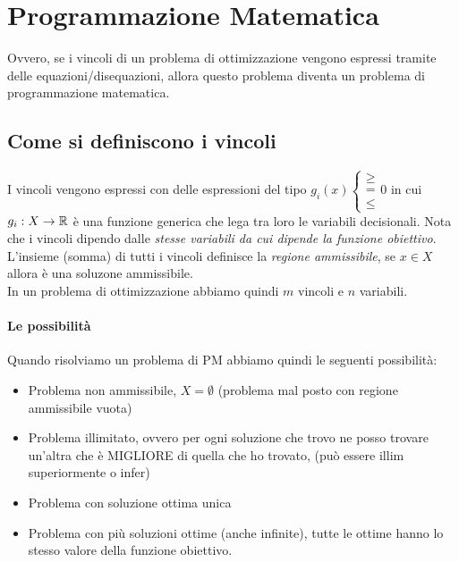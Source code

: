 \documentclass[12pt, a4paper, openany]{book}
\begin{document}
\section{Programmazione Matematica}
Ovvero, se i vincoli di un problema di ottimizzazione vengono espressi tramite delle equazioni/disequazioni, allora questo problema diventa un problema di programmazione matematica.

\subsection*{Come si definiscono i vincoli}
I vincoli vengono espressi con delle espressioni del tipo $g_i(x) \begin{cases}
        \geq \\ = \\ \leq %
    \end{cases} 0$
in cui $g_i: X\to \mathbb{R}$ è una funzione generica che lega tra loro le variabili decisionali.
Nota che i vincoli dipendo dalle \emph{stesse variabili da cui dipende la funzione obiettivo}.
\\L'insieme (somma) di tutti i vincoli definisce la \emph{regione ammissibile}, se $x \in X$ allora è una soluzone ammissibile.
\\In un problema di ottimizzazione abbiamo quindi $m$ vincoli e $n$ variabili.

\paragraph*{Le possibilità} Quando risolviamo un problema di PM abbiamo quindi le seguenti possibilità:
\begin{itemize}
    \item Problema non ammissibile, $X = \emptyset$ (problema mal posto con regione ammissibile vuota)
    \item Problema illimitato, ovvero per ogni soluzione che trovo ne posso trovare un'altra che è MIGLIORE di quella che ho trovato, (può essere illim superiormente o infer)
    \item Problema con soluzione ottima unica
    \item Problema con più soluzioni ottime (anche infinite), tutte le ottime hanno lo stesso valore della funzione obiettivo.
\end{itemize}
\end{document}
